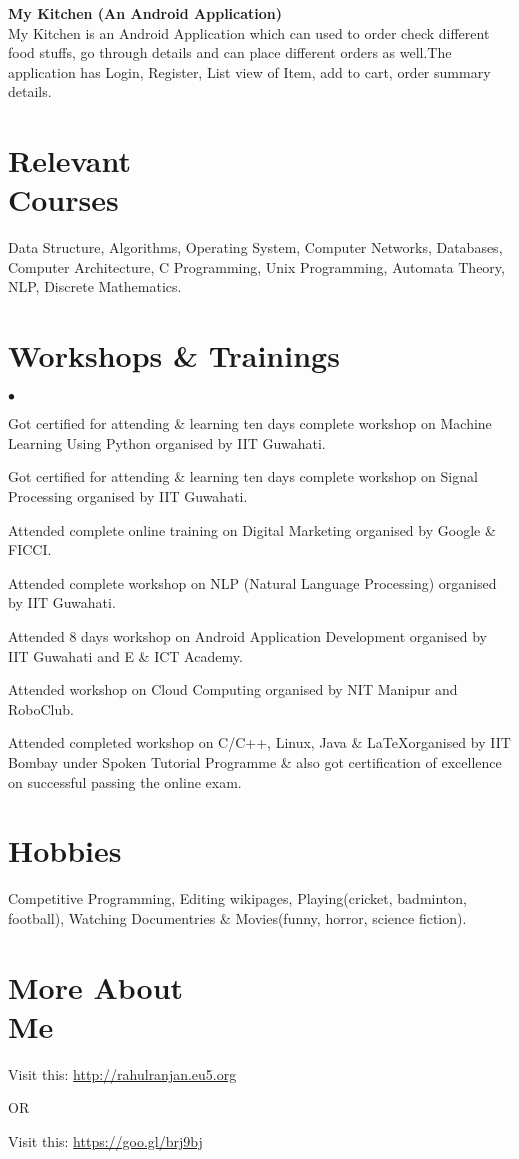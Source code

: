 \documentclass[margin,line]{res}
\newenvironment{list2}{
  \begin{list}{$\bullet$}{%
      \setlength{\itemsep}{0in}
      \setlength{\parsep}{0in} \setlength{\parskip}{0in}
      \setlength{\topsep}{0in} \setlength{\partopsep}{0in}
      \setlength{\leftmargin}{0.2in}}}{\end{list}}
\begin{document}
\begin{resume}
{\bf My Kitchen (An Android Application) }\\
My Kitchen is an Android Application which can used to order check different food stuffs, go through details and can place different orders as well.The application has Login, Register, List view of Item, add to cart, order summary details.
\\
\section{\sc Relevant \\ Courses}
Data Structure, Algorithms, Operating System,   Computer Networks, Databases, Computer Architecture, C Programming, Unix Programming, Automata Theory, NLP, Discrete Mathematics.

\section{\sc Workshops \& Trainings}
\begin{list2}
\item  Got certified for attending \& learning ten days complete workshop on Machine Learning Using Python organised by IIT Guwahati.
\item  Got certified for attending \& learning ten days complete workshop on Signal Processing organised by IIT Guwahati.
\item Attended complete online training on Digital Marketing organised by Google \& FICCI.\\
\item Attended complete workshop on NLP (Natural Language Processing) organised by IIT Guwahati. 
\item Attended 8 days workshop on Android Application Development organised by IIT Guwahati and E \& ICT Academy.
\item Attended workshop on Cloud Computing organised by NIT Manipur and RoboClub.
\item Attended completed workshop on C/C++, Linux, Java \& \LaTeX  organised by IIT Bombay under Spoken Tutorial Programme \& also got certification of excellence on successful passing the online exam.


\end{list2}
\section{\sc Hobbies}
Competitive Programming, Editing wikipages, Playing(cricket, badminton, football), Watching Documentries \& Movies(funny, horror, science fiction).


\section{\sc More About \\Me }
Visit this: \url{http://rahulranjan.eu5.org}
\begin{center}
OR
\end{center}
Visit this: \url{https://goo.gl/brj9bj}
\end{resume}
\end{document}
